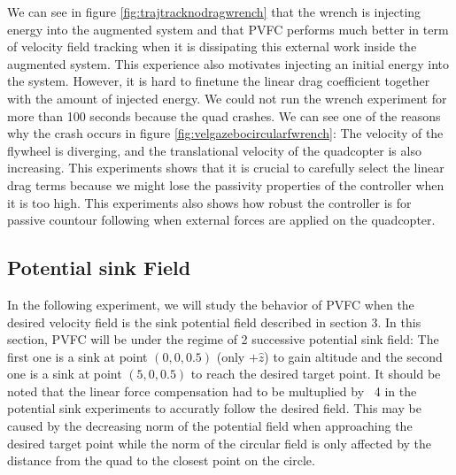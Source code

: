 We can see in figure \ref{fig:trajtracknodragwrench} that the wrench is injecting energy into the augmented system and that PVFC performs much better in term of velocity field tracking when it is dissipating this external work inside the augmented system. 
This experience also motivates injecting an initial energy into the system. However, it is hard to finetune the linear drag coefficient together with the amount of injected energy.
We could not run the wrench experiment for more than 100 seconds because the quad crashes. We can see one of the reasons why the crash occurs in figure \ref{fig:velgazebocircularfwrench}: The velocity of the flywheel is diverging, and the translational velocity of the quadcopter is also increasing. 
This experiments shows that it is crucial to carefully select the linear drag terms because we might lose the passivity properties of the controller when it is too high.
This experiments also shows how robust the controller is for passive countour following when external forces are applied on the quadcopter.
\subsection{Potential sink Field}
In the following experiment, we will study the behavior of PVFC when the desired velocity field is the sink potential field described in section 3.
In this section, PVFC will be under the regime of 2 successive potential sink field: The first one is a sink at point $(0,0,0.5)$ (only $+\hat{z}$) to gain altitude and
the second one is a sink at point $(5,0,0.5)$ to reach the desired target point. 
It should be noted that the linear force compensation had to be multuplied by ~4 in the potential sink experiments to accuratly follow the desired field.
This may be caused by the decreasing norm of the potential field when approaching the desired target point while the norm of the circular field is only affected by the distance from the quad to the closest point on the circle.  
